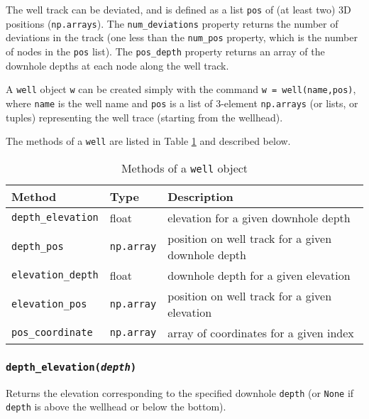 The well track can be deviated, and is defined as a list \texttt{pos} of (at least two) 3D positions (\texttt{np.arrays}).  The \texttt{num\_deviations} property returns the number of deviations in the track (one less than the \texttt{num\_pos} property, which is the number of nodes in the \texttt{pos} list).  The \texttt{pos\_depth} property returns an array of the downhole depths at each node along the well track.

A \texttt{well} object \texttt{w} can be created simply with the command \texttt{w = well(name,pos)}, where \texttt{name} is the well name and \texttt{pos} is a list of 3-element \texttt{np.arrays} (or lists, or tuples) representing the well trace (starting from the wellhead).

The methods of a \texttt{well} are listed in Table \ref{tb:well_methods} and described below.

\begin{table}
  \begin{center}
    \begin{tabular}{|l|l|l|}
      \hline
      \textbf{Method} & \textbf{Type} & \textbf{Description}\\
      \hline
      \texttt{depth\_elevation} & float & elevation for a given downhole depth \\
      \texttt{depth\_pos} & \texttt{np.array} & position on well track for a given downhole depth \\
      \texttt{elevation\_depth} & float & downhole depth for a given elevation \\
      \texttt{elevation\_pos} & \texttt{np.array} & position on well track for a given elevation \\
      \texttt{pos\_coordinate} & \texttt{np.array} & array of coordinates for a given index \\
      \hline
    \end{tabular}
    \caption{Methods of a \texttt{well} object}
    \label{tb:well_methods}
  \end{center}
\end{table}

\subsubsection{\texttt{depth\_elevation(\emph{depth})}}

Returns the elevation corresponding to the specified downhole \texttt{depth} (or \texttt{None} if \texttt{depth} is above the wellhead or below the bottom).

